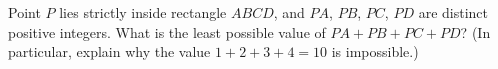 Point $P$ lies strictly inside rectangle $ABCD$, and $PA$, $PB$, $PC$, $PD$ are distinct positive integers. What is the least possible value of $PA+PB+PC+PD$? (In particular, explain why the value $1+2+3+4=10$ is impossible.)
